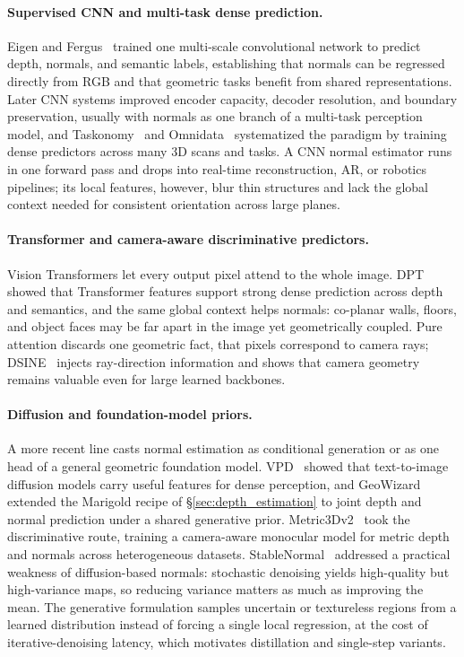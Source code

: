 \paragraph{Supervised CNN and multi-task dense prediction.}
Eigen and Fergus~\cite{eigen2015predicting} trained one multi-scale convolutional network to predict depth, normals, and semantic labels, establishing that normals can be regressed directly from RGB and that geometric tasks benefit from shared representations.
Later CNN systems improved encoder capacity, decoder resolution, and boundary preservation, usually with normals as one branch of a multi-task perception model, and Taskonomy~\cite{zamir2018taskonomy} and Omnidata~\cite{eftekhar2021omnidata} systematized the paradigm by training dense predictors across many 3D scans and tasks.
A CNN normal estimator runs in one forward pass and drops into real-time reconstruction, AR, or robotics pipelines; its local features, however, blur thin structures and lack the global context needed for consistent orientation across large planes.

\paragraph{Transformer and camera-aware discriminative predictors.}
Vision Transformers let every output pixel attend to the whole image.
DPT~\cite{dpt} showed that Transformer features support strong dense prediction across depth and semantics, and the same global context helps normals: co-planar walls, floors, and object faces may be far apart in the image yet geometrically coupled.
Pure attention discards one geometric fact, that pixels correspond to camera rays; DSINE~\cite{bae2024dsine} injects ray-direction information and shows that camera geometry remains valuable even for large learned backbones.

\paragraph{Diffusion and foundation-model priors.}
A more recent line casts normal estimation as conditional generation or as one head of a general geometric foundation model.
VPD~\cite{zhao2023unleashing} showed that text-to-image diffusion models carry useful features for dense perception, and GeoWizard~\cite{fu2024geowizard} extended the Marigold recipe of \S\ref{sec:depth_estimation} to joint depth and normal prediction under a shared generative prior.
Metric3Dv2~\cite{hu2024metric3dv2} took the discriminative route, training a camera-aware monocular model for metric depth and normals across heterogeneous datasets.
StableNormal~\cite{ye2024stablenormal} addressed a practical weakness of diffusion-based normals: stochastic denoising yields high-quality but high-variance maps, so reducing variance matters as much as improving the mean.
The generative formulation samples uncertain or textureless regions from a learned distribution instead of forcing a single local regression, at the cost of iterative-denoising latency, which motivates distillation and single-step variants.


